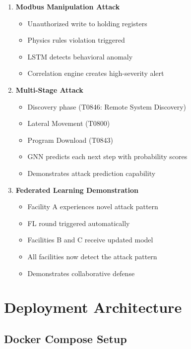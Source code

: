 \documentclass[12pt,a4paper]{article}
\begin{document}
\begin{enumerate}[leftmargin=1cm,itemsep=0pt]
    \item \textbf{Modbus Manipulation Attack}
    \begin{itemize}
        \item Unauthorized write to holding registers
        \item Physics rules violation triggered
        \item LSTM detects behavioral anomaly
        \item Correlation engine creates high-severity alert
    \end{itemize}
    
    \item \textbf{Multi-Stage Attack}
    \begin{itemize}
        \item Discovery phase (T0846: Remote System Discovery)
        \item Lateral Movement (T0800)
        \item Program Download (T0843)
        \item GNN predicts each next step with probability scores
        \item Demonstrates attack prediction capability
    \end{itemize}
    
    \item \textbf{Federated Learning Demonstration}
    \begin{itemize}
        \item Facility A experiences novel attack pattern
        \item FL round triggered automatically
        \item Facilities B and C receive updated model
        \item All facilities now detect the attack pattern
        \item Demonstrates collaborative defense
    \end{itemize}
\end{enumerate}

\section{Deployment Architecture}

\subsection{Docker Compose Setup}
\end{document}
